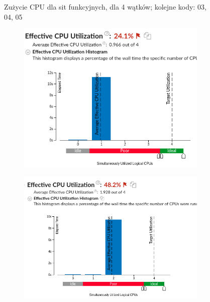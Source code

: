 \documentclass[12pt]{article}
\begin{document}
\begin{figure}[h!]
\begin{subfigure}[b]{0.32\linewidth}
	\end{subfigure}
	\caption{Zużycie CPU dla sit funkcyjnych, dla 4 wątków; kolejne kody: 03, 04, 05}
\end{figure}
\begin{figure}[h!]
	\begin{subfigure}[b]{0.32\linewidth}
		\includegraphics[width=\linewidth]{PR/07_01.png}
	\end{subfigure}
	\begin{subfigure}[b]{0.32\linewidth}
		\includegraphics[width=\linewidth]{PR/07_02.png}
	\end{subfigure}
	\begin{subfigure}[b]{0.32\linewidth}

\end{subfigure}
\end{figure}
\end{document}
